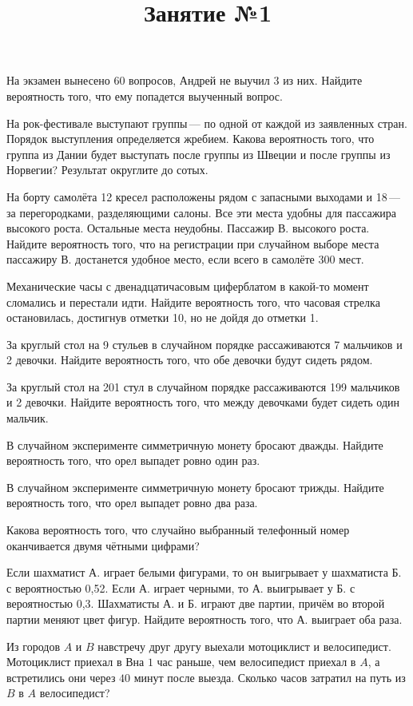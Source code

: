 \title{Занятие №1}
\begin{listofex}
	\item На экзамен вынесено 60 вопросов, Андрей не выучил 3 из них. Найдите вероятность того, что ему попадется выученный вопрос.
	\item На рок-фестивале выступают группы — по одной от каждой из заявленных стран. Порядок выступления определяется жребием. Какова вероятность того, что группа из Дании будет выступать после группы из Швеции и после группы из Норвегии? Результат округлите до сотых.
	\item На борту самолёта 12 кресел расположены рядом с запасными выходами и 18 — за перегородками, разделяющими салоны. Все эти места удобны для пассажира высокого роста. Остальные места неудобны. Пассажир В. высокого роста. Найдите вероятность того, что на регистрации при случайном выборе места пассажиру В. достанется удобное место, если всего в самолёте 300 мест.
	\item Механические часы с двенадцатичасовым циферблатом в какой-то момент сломались и перестали идти. Найдите вероятность того, что часовая стрелка остановилась, достигнув отметки 10, но не дойдя до отметки 1.
	\item За круглый стол на 9 стульев в случайном порядке рассаживаются 7 мальчиков и 2 девочки. Найдите вероятность того, что обе девочки будут сидеть рядом.
	\item За круглый стол на 201 стул в случайном порядке рассаживаются 199 мальчиков и 2 девочки. Найдите вероятность того, что между девочками будет сидеть один мальчик.
	\item В случайном эксперименте симметричную монету бросают дважды. Найдите вероятность того, что орел выпадет ровно один раз.
	\item В случайном эксперименте симметричную монету бросают трижды. Найдите вероятность того, что орел выпадет ровно два раза.
	\item Какова вероятность того, что случайно выбранный телефонный номер оканчивается двумя чётными цифрами?
	\item Если шахматист А. играет белыми фигурами, то он выигрывает у шахматиста Б. с вероятностью 0,52. Если А. играет черными, то А. выигрывает у Б. с вероятностью 0,3. Шахматисты А. и Б. играют две партии, причём во второй партии меняют цвет фигур. Найдите вероятность того, что А. выиграет оба раза.
	\item Из городов \( A  \) и \( B  \) навстречу друг другу выехали мотоциклист и велосипедист. Мотоциклист приехал в \(В\)на \(1\) час раньше, чем велосипедист приехал в \( A \), а встретились они через \(40\) минут после выезда. Сколько часов затратил на путь из \(  B  \) в \( A  \) велосипедист?

\end{listofex}
